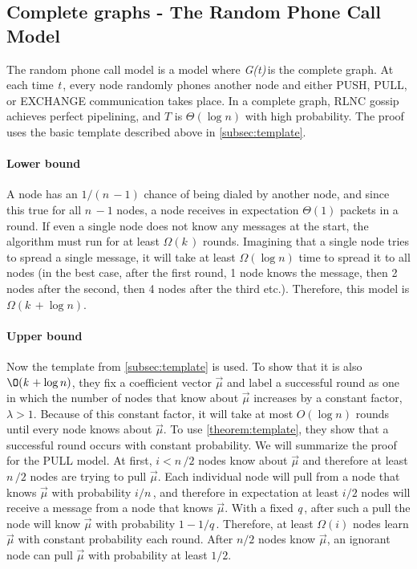 \documentclass{article} %
\def\numNodes{\textit{n}\,}
\def\graph{\textit{G(t)}\,}
\def\graphtime{\textit{t}\,}
\def\numMessages{\textit{k}\,}
\def\fieldSize{\textit{q}\,}
\begin{document}
\subsection{Complete graphs - The Random Phone Call Model}
The random phone call model is a model where \graph is the complete graph. At each time \graphtime, every node randomly phones another node and either PUSH, PULL, or EXCHANGE communication takes place.  In a complete graph, RLNC gossip achieves perfect pipelining, and $T$ is $\Theta(\log{n})$ with high probability. The proof uses the basic template described above in \ref{subsec:template}. 
\paragraph{Lower bound}
A node has an $1/(\numNodes-1)$ chance of being dialed by another node, and since this true for all $\numNodes-1$ nodes, a node receives in expectation $\Theta(1)$ packets in a round. If even a single node does not know any messages at the start, the algorithm must run for at least $\Omega(\numMessages)$ rounds. Imagining that a single node tries to spread a single message, it will take at least $\Omega(\log{n})$ time to spread it to all nodes (in the best case, after the first round, 1 node knows the message, then 2 nodes after the second, then 4 nodes after the third etc.). Therefore, this model is $\Omega(\numMessages + \log{n})$.
\paragraph{Upper bound}
Now the template from \ref{subsec:template} is used. To show that it is also $\O(\numMessages + \log{n})$, they fix a coefficient vector $\vec{\mu}$ and label a successful round as one in which the number of nodes that know about $\vec{\mu}$ increases by a constant factor, $\lambda > 1$. Because of this constant factor, it will take at most $O(\log{n})$ rounds until every node knows about $\vec{\mu}$. To use \ref{theorem:template}, they show that a successful round occurs with constant probability. We will summarize the proof for the PULL model. At first, $i < \numNodes/2$ nodes know about $\vec{\mu}$ and therefore at least $\numNodes/2$ nodes are trying to pull $\vec{\mu}$. Each individual node will pull from a node that knows $\vec{\mu}$ with probability $i/\numNodes$, and therefore in expectation at least $i/2$ nodes will receive a message from a node that knows $\vec{\mu}$. With a fixed \fieldSize, after such a pull the node will know $\vec{\mu}$ with probability $1-1/\fieldSize$.  Therefore, at least $\Omega(i)$ nodes learn $\vec{\mu}$ with constant probability each round. After $n/2$ nodes know $\vec{\mu}$, an ignorant node can pull $\vec{\mu}$ with probability at least $1/2$.
\end{document}

